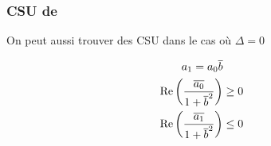     \subsubsection{CSU de \cite{stupfel_implementation_2015}}

      On peut aussi trouver des CSU dans le cas où \(\Delta = 0\)

      \begin{prop}
        \begin{align}
          a_1 = a_0 {\overline{b}} \\
          \operatorname{Re}\left(\dfrac{{\overline{a_0}}}{1 + {\overline{b}}^2}\right) &\ge 0 \\
          \operatorname{Re}\left(\dfrac{{\overline{a_1}}}{1 + {\overline{b}}^2}\right) &\le 0
        \end{align}
      \end{prop}

